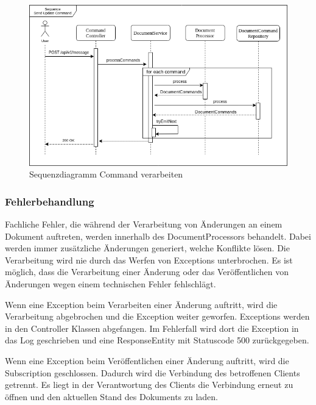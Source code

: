 \begin{figure}[h]
    \centering
    \begin{minipage}[b]{1\textwidth}
        \includegraphics[width=\textwidth]{images/seq_send_command.drawio}
        \caption{Sequenzdiagramm Command verarbeiten}
    \end{minipage}\label{fig:figuresqcmd}
\end{figure}

\subsubsection{Fehlerbehandlung}

Fachliche Fehler, die während der Verarbeitung von Änderungen an einem Dokument auftreten, werden innerhalb des DocumentProcessors behandelt.
Dabei werden immer zusätzliche Änderungen generiert, welche Konflikte lösen.
Die Verarbeitung wird nie durch das Werfen von Exceptions unterbrochen.
Es ist möglich, dass die Verarbeitung einer Änderung oder das Veröffentlichen von Änderungen wegen einem technischen Fehler fehlschlägt.

Wenn eine Exception beim Verarbeiten einer Änderung auftritt, wird die Verarbeitung abgebrochen und die Exception weiter geworfen.
Exceptions werden in den Controller Klassen abgefangen.
Im Fehlerfall wird dort die Exception in das Log geschrieben und eine ResponseEntity mit Statuscode 500 zurückgegeben.

Wenn eine Exception beim Veröffentlichen einer Änderung auftritt, wird die Subscription geschlossen.
Dadurch wird die Verbindung des betroffenen Clients getrennt.
Es liegt in der Verantwortung des Clients die Verbindung erneut zu öffnen und den aktuellen Stand des Dokuments zu laden.

